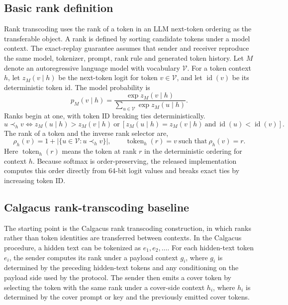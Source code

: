\documentclass[fleqn,10pt]{wlscirep}
\begin{document}
\subsection*{Basic rank definition}\label{sec:rank-method}

Rank transcoding uses the rank of a token in an LLM next-token ordering as the transferable object. A rank is defined by sorting candidate tokens under a model context. The exact-replay guarantee assumes that sender and receiver reproduce the same model, tokenizer, prompt, rank rule and generated token history.
Let \(M\) denote an autoregressive language model with vocabulary \(\mathcal{V}\). For a token context \(h\), let \(z_M(v\mid h)\) be the next-token logit for token \(v\in\mathcal{V}\), and let \(\operatorname{id}(v)\) be its deterministic token id. The model probability is
\begin{equation}
p_M(v\mid h)=
\frac{\exp z_M(v\mid h)}
{\sum_{u\in\mathcal V}\exp z_M(u\mid h)}.
\label{eq:next-token-prob}
\end{equation}
Ranks begin at one, with token ID breaking ties deterministically.
\begin{equation}
u \prec_h v
\Longleftrightarrow
z_M(u\mid h)>z_M(v\mid h)
\ \text{or}\
\left[z_M(u\mid h)=z_M(v\mid h)\ \text{and}\ \operatorname{id}(u)<\operatorname{id}(v)\right].
\label{eq:rank-order}
\end{equation}
The rank of a token and the inverse rank selector are,
\begin{equation}
\rho_h(v)=1+\left|\{u\in\mathcal V:u\prec_h v\}\right|,
\qquad
\operatorname{token}_h(r)=v\ \text{such that}\ \rho_h(v)=r.
\label{eq:rank-function}
\end{equation}
Here \(\operatorname{token}_h(r)\) means the token at rank \(r\) in the deterministic ordering for context \(h\). Because softmax is order-preserving, the released implementation computes this order directly from 64-bit logit values and breaks exact ties by increasing token ID.

\subsection*{Calgacus rank-transcoding baseline}\label{sec:calgacus-method}

The starting point is the Calgacus rank transcoding construction, in which ranks rather than token identities are transferred between contexts\cite{NorelliBronstein2026Calgacus}. In the Calgacus procedure, a hidden text can be tokenized as \(e_1,e_2,\ldots\). For each hidden-text token \(e_i\), the sender computes its rank under a payload context \(g_i\), where \(g_i\) is determined by the preceding hidden-text tokens and any conditioning on the payload side used by the protocol. The sender then emits a cover token by selecting the token with the same rank under a cover-side context \(h_i\), where \(h_i\) is determined by the cover prompt or key and the previously emitted cover tokens.
\end{document}
